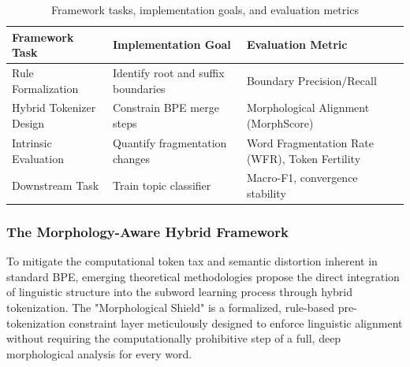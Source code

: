 \documentclass[12pt]{article}
\begin{document}
	
	\begin{table}[h]
		\centering
		\renewcommand{\arraystretch}{1.3}
		\begin{tabularx}{\textwidth}{l X X}
			\toprule
			\textbf{Framework Task} & \textbf{Implementation Goal} & \textbf{Evaluation Metric} \\
			\midrule
			
			Rule Formalization 
			& Identify root and suffix boundaries 
			& Boundary Precision/Recall \\
			
			Hybrid Tokenizer Design 
			& Constrain BPE merge steps 
			& Morphological Alignment (MorphScore) \\
			
			Intrinsic Evaluation 
			& Quantify fragmentation changes 
			& Word Fragmentation Rate (WFR), Token Fertility \\
			
			Downstream Task 
			& Train topic classifier 
			& Macro-F1, convergence stability \\
			
			\bottomrule
		\end{tabularx}
		\caption{Framework tasks, implementation goals, and evaluation metrics}
	\end{table}
	
	\newpage
	
	
	\subsubsection{The Morphology-Aware Hybrid Framework }
	
	To mitigate the computational token tax and semantic distortion inherent in standard BPE, emerging theoretical methodologies propose the direct integration of linguistic structure into the subword learning process through hybrid tokenization. The "Morphological Shield" is a formalized, rule-based pre-tokenization constraint layer meticulously designed to enforce linguistic alignment without requiring the computationally prohibitive step of a full, deep morphological analysis for every word. 
	
\end{document}
